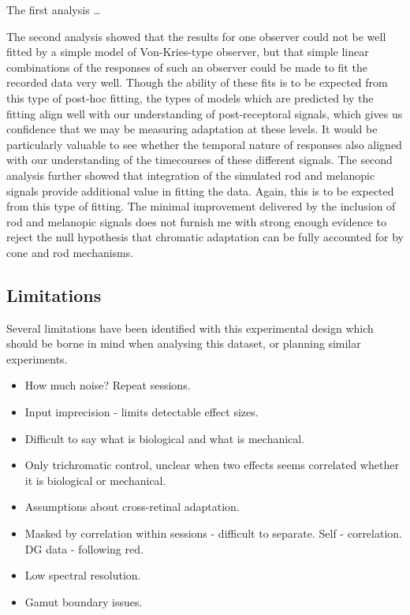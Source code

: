 The first analysis \dots

The second analysis showed that the results for one observer could not be well fitted by a simple model of Von-Kries-type observer, but that simple linear combinations of the responses of such an observer could be made to fit the recorded data very well. Though the ability of these fits is to be expected from this type of post-hoc fitting, the types of models which are predicted by the fitting align well with our understanding of post-receptoral signals, which gives us confidence that we may be measuring adaptation at these levels. It would be particularly valuable to see whether the temporal nature of responses also aligned with our understanding of the timecourses of these different signals. 
The second analysis further showed that integration of the simulated rod and melanopic signals provide additional value in fitting the data. Again, this is to be expected from this type of fitting. The minimal improvement delivered by the inclusion of rod and melanopic signals does not furnish me with strong enough evidence to reject the null hypothesis that chromatic adaptation can be fully accounted for by cone and rod mechanisms. 


\subsection{Limitations}

Several limitations have been identified with this experimental design which should be borne in mind when analysing this dataset, or planning similar experiments.

\begin{itemize}
\item How much noise? Repeat sessions.
\item Input imprecision - limits detectable effect sizes.
\item Difficult to say what is biological and what is mechanical.
\item Only trichromatic control, unclear when two effects seems correlated whether it is biological or mechanical.
\item Assumptions about cross-retinal adaptation.
\item Masked by correlation within sessions - difficult to separate. Self - correlation. DG data - following red.
\item Low spectral resolution.
\item Gamut boundary issues.
\end{itemize}


